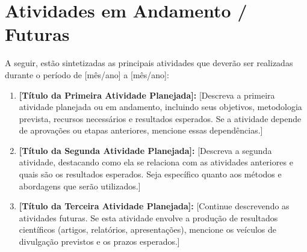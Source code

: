 
\section{Atividades em Andamento / Futuras}

A seguir, estão sintetizadas as principais atividades que deverão ser 
realizadas durante o período de [mês/ano] a [mês/ano]:

\begin{enumerate}
    \item [\textbf{i.}] \textbf{[Título da Primeira Atividade Planejada]:} 
    [Descreva a primeira atividade planejada ou em andamento, incluindo 
    seus objetivos, metodologia prevista, recursos necessários e resultados 
    esperados. Se a atividade depende de aprovações ou etapas anteriores, 
    mencione essas dependências.]
    
    \item [\textbf{ii.}] \textbf{[Título da Segunda Atividade Planejada]:} 
    [Descreva a segunda atividade, destacando como ela se relaciona com 
    as atividades anteriores e quais são os resultados esperados. Seja 
    específico quanto aos métodos e abordagens que serão utilizados.]
    
    
    \item [\textbf{iii.}] \textbf{[Título da Terceira Atividade Planejada]:} 
    [Continue descrevendo as atividades futuras. Se esta atividade envolve 
    a produção de resultados científicos (artigos, relatórios, apresentações), 
    mencione os veículos de divulgação previstos e os prazos esperados.]
    
\end{enumerate}


% 
